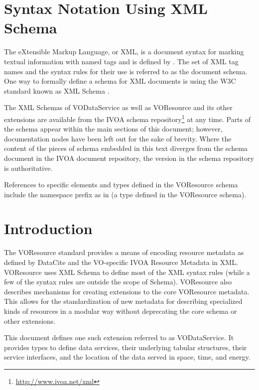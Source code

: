 \documentclass[11pt,a4paper]{ivoa}
\begin{document}
\section*{Syntax Notation Using XML Schema}

The eXtensible Markup Language, or XML, is a document syntax for marking
textual information with named tags and is defined by \citet{std:XML}.
The set of XML tag names and the syntax
rules for their use is referred to as the document schema.  One way to
formally define a schema for XML documents is using the W3C standard
known as XML Schema \citep{std:XSD}.

The XML Schemas of VODataService as well as VOResource and its other
extensions are
available from the IVOA schema
repository\footnote{\url{http://www.ivoa.net/xml}} at any time.
Parts of the schema appear within the main sections of this document;
however, documentation nodes have been left out for the sake of brevity.
Where the content of the pieces of schema embedded in this text
diverges from the schema document in the IVOA document
repository, the version in the schema repository is authoritative.

References to specific elements and types defined in the VOResource
schema include the namespace prefix  as in
 (a type defined in the VOResource schema).

\section{Introduction}

The VOResource standard \citep{2018ivoa.spec.0625P} provides a means of
encoding resource metadata as defined by DataCite \citep{std:DataCite40}
and the VO-specific IVOA Resource Metadata \citep{2007ivoa.spec.0302H} in XML.
VOResource uses XML Schema \citep{std:XSD} to define
most of the XML syntax rules (while a few of the syntax rules are
outside the scope of Schema).  VOResource also describes mechanisms
for creating extensions to the core VOResource metadata.  This allows
for the standardization of new metadata for describing specialized
kinds of resources in a modular way without deprecating the core
schema or other extensions.  

This document defines one such extension referred to as VODataService.
It provides types to define data services, their underlying tabular
structures, their service interfaces, and the location of the data
served in space, time, and energy.
\end{document}
